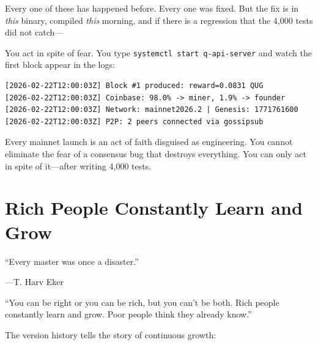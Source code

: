 \documentclass[11pt,a4paper]{article}
\begin{document}
Every one of these has happened before. Every one was fixed. But the
fix is in \emph{this} binary, compiled \emph{this} morning, and if
there is a regression that the 4{,}000 tests did not catch---

You act in spite of fear. You type \texttt{systemctl start q-api-server}
and watch the first block appear in the logs:

\begin{lstlisting}[language={}, basicstyle=\ttfamily\footnotesize\color{quggreen!70!black}]
[2026-02-22T12:00:03Z] Block #1 produced: reward=0.0831 QUG
[2026-02-22T12:00:03Z] Coinbase: 98.0% -> miner, 1.9% -> founder
[2026-02-22T12:00:03Z] Network: mainnet2026.2 | Genesis: 1771761600
[2026-02-22T12:00:03Z] P2P: 2 peers connected via gossipsub
\end{lstlisting}

\begin{principle}[title={\textbf{The Principle}}]
Every mainnet launch is an act of faith disguised as engineering.
You cannot eliminate the fear of a consensus bug that destroys everything.
You can only act in spite of it---after writing 4{,}000 tests.
\end{principle}


\section{Rich People Constantly Learn and Grow}

\epigraph{``Every master was once a disaster.''}%
{---T. Harv Eker}

\begin{wealthbox}[title={\raisebox{-0.5pt}{\tiny$\bigstar$} Wealth File \#10}]
``You can be right or you can be rich, but you can't be both.
Rich people constantly learn and grow. Poor people think they
already know.''
\end{wealthbox}

\vspace{0.3cm}

The version history tells the story of continuous growth:
\end{document}
